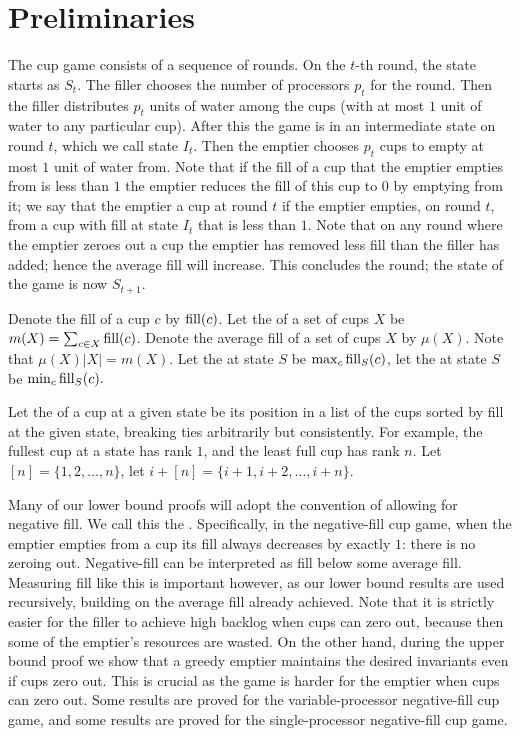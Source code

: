 \section{Preliminaries}\label{sec:prelims}
The cup game consists of a sequence of rounds. On the $t$-th
round, the state starts as $S_t$. The filler chooses the number
of processors $p_t$ for the round. Then the filler distributes
$p_t$ units of water among the cups (with at most $1$ unit of
water to any particular cup). After this the game is in an
intermediate state on round $t$, which we call state $I_t$. Then
the emptier chooses $p_t$ cups to empty at most $1$ unit of water
from. Note that if the fill of a cup that the emptier empties
from is less than $1$ the emptier reduces the fill of this cup to
$0$ by emptying from it; we say that the emptier  a cup at round $t$ if the emptier empties, on round $t$,
from a cup with fill at state $I_t$ that is less than $1$. Note
that on any round where the emptier zeroes out a cup the emptier
has removed less fill than the filler has added; hence the
average fill will increase. This concludes the round; the state
of the game is now $S_{t+1}$.

Denote the fill of a cup $c$ by $\operatorname{\text{\textup{fill}}}(c)$. Let the  of
a set of cups $X$ be $m(X) = \sum_{c\in X} \operatorname{\text{\textup{fill}}}(c)$. Denote the
average fill of a set of cups $X$ by $\mu(X)$. Note that $\mu(X)
|X| = m(X)$. Let the  at state $S$ be $\max_c
\operatorname{\text{\textup{fill}}}_S(c)$, let the  at state $S$ be $\min_c
\operatorname{\text{\textup{fill}}}_S(c).$

Let the  of a cup at a given state be its position in
a list of the cups sorted by fill at the given state, breaking
ties arbitrarily but consistently. For example, the fullest cup
at a state has rank $1$, and the least full cup has rank $n$. Let
$[n] = \{1,2,\ldots, n\}$, let $i+[n] = \{i+1, i+2, \ldots,
i+n\}$.

Many of our lower bound proofs will adopt the convention of
allowing for negative fill. We call this the . Specifically, in the negative-fill cup game, when the
emptier empties from a cup its fill always decreases by exactly
$1$: there is no zeroing out. Negative-fill can be interpreted as
fill below some average fill. Measuring fill like this is
important however, as our lower bound results are used
recursively, building on the average fill already achieved. Note
that it is strictly easier for the filler to achieve high backlog
when cups can zero out, because then some of the emptier's
resources are wasted. On the other hand, during the upper bound
proof we show that a greedy emptier maintains the desired
invariants even if cups zero out. This is crucial as the game is
harder for the emptier when cups can zero out. Some results are
proved for the variable-processor negative-fill cup game, and
some results are proved for the single-processor negative-fill
cup game.

